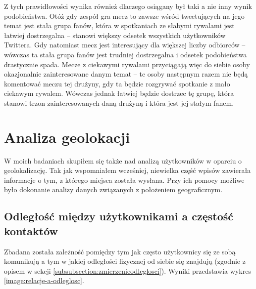 Z tych prawidłowości wynika również dlaczego osiągany był taki a nie inny
wynik podobieństwa. Otóż gdy zespół gra mecz to zawsze
wśród tweetujących na jego temat jest stała grupa fanów, która w spotkaniach
ze słabymi rywalami jest łatwiej dostrzegalna -- stanowi większy odsetek
wszystkich użytkowników Twittera. Gdy natomiast mecz jest interesujący
dla większej liczby odbiorców -- wówczas ta stała grupa fanów jest trudniej
dostrzegalna i odsetek podobieństwa drastycznie spada.
Mecze z ciekawymi rywalami przyciągają więc do siebie osoby okazjonalnie zainteresowane
danym temat -- te osoby następnym razem nie będą komentować meczu tej drużyny,
gdy ta będzie rozgrywać spotkanie z mało ciekawym rywalem. 
Wówczas jednak łatwiej będzie dostrzec tę grupę, która stanowi trzon zainteresowanych
daną drużyną i która jest jej stałym fanem.














\section{Analiza geolokacji}
\label{section:analizageograficzna}

W moich badaniach skupiłem się także nad analizą użytkowników w oparciu 
o geolokalizację. Tak jak wspomniałem wcześniej, niewielka część wpisów
zawierała informacje o tym, z którego miejsca została wysłana.
Przy ich pomocy możliwe było dokonanie analizy danych związanych z położeniem
geograficznym.

\subsection{Odległość między użytkownikami a częstość kontaktów}
\label{subsection:odlegloscmiedzyuzytkownikami}
Zbadana została zależność pomiędzy tym jak często użytkownicy się ze sobą
komunikują a tym w jakiej odległości fizycznej od siebie się znajdują (zgodnie
z opisem w sekcji \ref{subsubsection:zmierzenieodleglosci}). Wyniki przedstawia
wykres \ref{image:relacje-a-odleglosc}.

